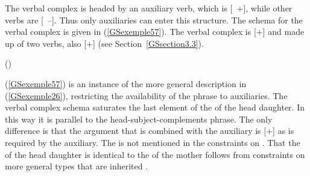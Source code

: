 The verbal complex is headed by an auxiliary verb, which is [\aux~$+$], while other verbs are [\aux~$–$].  Thus only auxiliaries can enter this structure. The schema for the verbal complex is given in (\ref{GSexemple57}). The verbal complex is [\light{}$+$] and made up of two verbs, also [\light{}$+$] (see Section~\ref{GSsection3.3}). 


\eas 
\label{GSexemple57}%
 () \impl \\
\zs


(\ref{GSexemple57}) is an instance of the more general description in (\ref{GSexemple26}), restricting the 	availability of the phrase to auxiliaries. The verbal complex schema saturates the last element of the \compsl of the head daughter. In this way it is parallel to the head-subject-complements phrase. The only difference is that the argument
that is combined with the auxiliary is [\light{}$+$] as is required by the auxiliary. The \subjl is not mentioned in the constraints on . That the \subjv of the head daughter is identical to the \subjv of the mother follows from constraints on more general types that are inherited \crossrefchapterp[\page \pageref{prop:valence-principle}]{properties}. 



